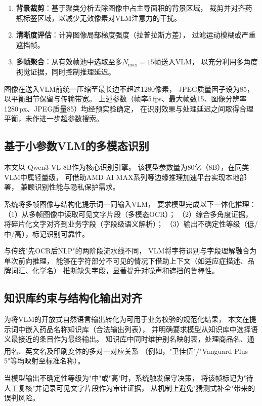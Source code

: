 \documentclass[12pt, a4paper]{article}
\begin{document}
\begin{enumerate}[leftmargin=2em]
  \item \textbf{背景裁剪}：基于聚类分析去除图像中占主导面积的背景区域，
        裁剪并对齐药瓶标签区域，以减少无效像素对VLM注意力的干扰。
  \item \textbf{清晰度评估}：计算图像局部梯度强度（拉普拉斯方差），
        过滤运动模糊或严重遮挡帧。
  \item \textbf{多帧聚合}：从有效帧池中选取至多$N_{\max}=15$帧送入VLM，
        以充分利用多角度视觉证据，同时控制推理延迟。
\end{enumerate}

图像在送入VLM前统一压缩至最长边不超过1280像素，
JPEG质量因子设为85，以平衡细节保留与传输带宽。
上述参数（帧率5\,fps、最大帧数15、图像分辨率1280\,px、JPEG质量85）均经预实验确定，
在识别效果与处理延迟之间取得合理平衡，未作进一步超参数搜索。

\subsection{基于小参数VLM的多模态识别}
\label{sec:method:vlm}

本文以 Qwen3-VL-8B\cite{ref:qwen3vl}作为核心识别引擎。
该模型参数量为80亿（8B），在同类VLM中属轻量级，
可借助AMD AI MAX系列等边缘推理加速平台实现本地部署，
兼顾识别性能与隐私保护需求。

系统将多帧图像与结构化提示词一同输入VLM，
要求模型完成以下一体化推理：
（1）从多帧图像中读取可见文字片段（多模态OCR）；
（2）综合多角度证据，将碎片化文字对齐到业务字段（字段级语义解析）；
（3）输出不确定性等级（低/中/高），标记识别可靠性。

与传统"先OCR后NLP"的两阶段流水线不同，
VLM将字符识别与字段理解融合为单次前向推理，
能够在字符部分不可见的情况下借助上下文（如适应症描述、品牌词汇、化学名）
推断缺失字段，显著提升对噪声和遮挡的鲁棒性。

\subsection{知识库约束与结构化输出对齐}
\label{sec:method:kb}

为将VLM的开放式自然语言输出转化为可用于业务校验的规范化结果，
本文在提示词中嵌入药品名称知识库（合法输出列表），
并明确要求模型从知识库中选择语义最接近的条目作为最终输出。
知识库中同时维护别名映射表，处理商品名、通用名、英文名及印刷变体的多对一对应关系
（例如，"卫佳\textsuperscript{\textregistered}伍"/"Vanguard Plus 5"等均映射至标准名称）。

当模型输出不确定性等级为"中"或"高"时，系统触发保守决策，
将该帧标记为"待人工复核"并记录可见文字片段作为审计证据，
从机制上避免"猜测式补全"带来的误判风险。
\end{document}
